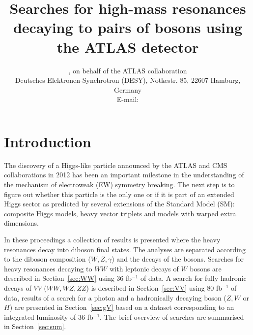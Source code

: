 \documentclass{PoS}
\title{Searches for high-mass resonances decaying to pairs of bosons using the ATLAS detector}
\author{\speaker{Kirill Grevtsov}, {on behalf of the ATLAS collaboration}\\%
        Deutsches Elektronen-Synchrotron (DESY), Notkestr. 85, 22607 Hamburg, Germany\\
        E-mail: \email{kirill.grevtsov@cern.ch}}
\begin{document}
\linenumbers

\vspace*{-10mm}
\section{Introduction}
\vspace*{-2mm}
The discovery of a Higgs-like particle announced by the ATLAS and CMS collaborations in 2012 \cite{HIGG-2012-27,CMS-HIG-12-028} has been an important milestone in the understanding of the mechanism of electroweak (EW) symmetry breaking. %
The next step is to figure out whether this particle is the only one or if it is part of an extended Higgs sector as predicted by several extensions of the Standard Model (SM): composite Higgs models, heavy vector triplets and models with warped extra dimensions.


In these proceedings a collection of results is presented where the heavy resonances decay into diboson final states. 
The analyses are separated according to the diboson composition ($W,Z, \gamma$) and the decays of the bosons. 
Searches for heavy resonances decaying to $WW$ with leptonic decays of $W$ bosons are described in Section~\ref{sec:WW} using 36 fb$^{-1}$ of data.
A search for fully hadronic decays of $VV$ ($WW, WZ, ZZ$) is described in Section~\ref{sec:VV} using 80 fb$^{-1}$ of data, results of a search for a photon and a hadronically decaying boson ($Z,W$ or $H$) are presented in Section~\ref{sec:gV} based on a dataset corresponding to an integrated luminosity of 36 fb$^{-1}$. 
The brief overview of searches are summarised in Section~\ref{sec:sum}.
\end{document}
